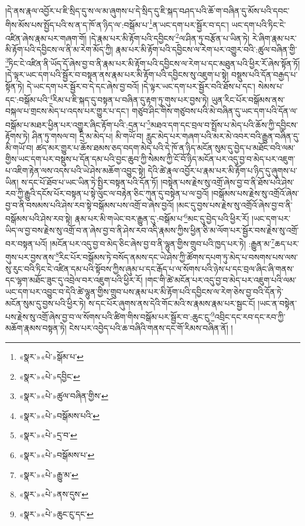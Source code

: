 །དེ་ནས་རྣལ་འབྱོར་པ་ཇི་སྲིད་དུ་ས་ལ་མ་ཞུགས་པ་དེ་སྲིད་དུ་ཇི་སྐད་བཤད་པའི་ཆོ་ག་བཞིན་དུ་མོས་པའི་དབང་གིས་མོས་པས་སྤྱོད་པའི་ས་ན་ད་ཁོ་ན་ཉིད་ལ་:བསྒོམ་པ་\footnote{«སྣར་»«པེ་»སྒོམ་པ་}ན་ཡང་དག་པར་སྦྱོར་བ་དང་། ཡང་དག་པའི་ཏིང་ངེ་འཛིན་ཞེས་རྣམ་པར་གཞག་གོ། །དེ་རྣམ་པར་མི་རྟོག་པའི་དབྱིངས་\footnote{«སྣར་»«པེ་»དབྱིང་}ལ་ཤིན་ཏུ་བརྩོན་པ་ཡིན་ཏེ། རེ་ཞིག་རྣམ་པར་མི་རྟོག་པའི་དབྱིངས་ལ་ནི་མ་རེག་མོད་ཀྱི། རྣམ་པར་མི་རྟོག་པའི་དབྱིངས་ལ་རེག་པར་འགྱུར་བའི་:ཚུལ་བཞིན་གྱི་\footnote{«སྣར་»«པེ་»ཚུལ་བཞིན་གྱིས་}ཏིང་ངེ་འཛིན་ནི་ཡོད་དོ་ཞེས་བྱ་བ་ནི་རྣམ་པར་མི་རྟོག་པའི་དབྱིངས་ལ་རེག་པ་དང་མཐུན་པའི་ཕྱིར་རོ་ཞེས་སྟོན་ཏོ། །དེ་ལྟར་ཡང་དག་པའི་སྦྱོར་བ་བསྟན་ནས་རྣམ་པར་མི་རྟོག་པའི་དབྱིངས་སུ་འཇུག་པ་སྟེ། བསྡུས་པའི་དོན་བརྒྱད་པ་སྟོན་ཏེ། དེ་ཡང་དག་པར་སྦྱོར་བ་དེ་དང་ཞེས་བྱ་བའོ། །དེ་ལྟར་ཡང་དག་པར་སྦྱོར་བའི་ཐོས་པ་དང་། སེམས་པ་དང་:བསྒོམ་པའི་\footnote{«སྣར་»«པེ་»བསྒོམས་པའི་}རིམ་པ་ཇི་སྐད་དུ་བསྟན་པ་བཞིན་དུ་རྟག་ཏུ་གུས་པར་བྱས་ཏེ། ཡུན་རིང་པོར་བསྒོམས་ནས་བསྐལ་པ་གྲངས་མེད་པ་འདས་པར་གྱུར་པ་དང་། གཙུབ་ཤིང་གིས་གཙུབས་པའི་མེ་བཞིན་དུ་ཡང་དག་པའི་དོན་ལ་བསྒོམ་པ་མཐར་ཕྱིན་པར་འགྱུར་ཞིང་རྟོག་པའི་:དྲན་པ་\footnote{«སྣར་»«པེ་»དྲ་བ་}མཐའ་དག་དང་བྲལ་བ་སྤྲོས་པ་མེད་པའི་ཆོས་ཀྱི་དབྱིངས་རྟོགས་ཏེ། ཤིན་ཏུ་གསལ་བ། དྲི་མ་མེད་པ། མི་གཡོ་བ། རླུང་མེད་པར་གཞག་པའི་མར་མེ་འབར་བའི་རྒྱུན་བཞིན་དུ་མི་གཡོ་བ། ཚད་མར་གྱུར་པ་ཆོས་ཐམས་ཅད་བདག་མེད་པའི་དེ་ཁོ་ན་ཉིད་མངོན་སུམ་དུ་བྱེད་པ་མཐོང་བའི་ལམ་གྱིས་ཡང་དག་པར་བསྡུས་པ་དོན་དམ་པའི་བྱང་ཆུབ་ཀྱི་སེམས་ཀྱི་ངོ་བོ་ཉིད་མངོན་པར་འདུ་བྱ་བ་མེད་པར་འཇུག་པ་འཇིག་རྟེན་ལས་འདས་པའི་ཡེ་ཤེས་མཆོག་འབྱུང་སྟེ། དེའི་ཚེ་རྣལ་འབྱོར་པ་རྣམ་པར་མི་རྟོག་པ་ཉིད་དུ་ཞུགས་པ་ཡིན། ས་དང་པོ་ཐོབ་པ་ཡང་ཡིན་ཏེ་སྤྱིར་བསྟན་པའི་དོན་ཏོ། །བསྟེན་པས་རྗེས་སུ་འགྲོ་ཞེས་བྱ་བ་ནི་ཐོས་པའི་ཤེས་རབ་ཀྱི་རྒྱུའི་དངོས་པོར་བསྟན་པ་སྟེ་ལུང་ལ་བརྟེན་ཅིང་ཀུན་དུ་བསྟེན་པ་ལ་བྱའོ། །བསྒོམས་པས་རྗེས་སུ་འགྲོའོ་ཞེས་བྱ་བ་ནི་བསམས་པའི་ཤེས་རབ་སྟེ་བསྒོམས་པས་འགྲོ་བ་ཞེས་བྱའོ། །མང་དུ་བྱས་པས་རྗེས་སུ་འགྲོའོ་ཞེས་བྱ་བ་ནི་བསྒོམས་པའི་ཤེས་རབ་སྟེ། རྣམ་པར་མི་གཡེང་བར་རྒྱུན་དུ་:བསྒོམ་པ་\footnote{«སྣར་»«པེ་»བསྒོམས་པ་}མང་དུ་བྱེད་པའི་ཕྱིར་རོ། །ཡང་དག་པར་ཡིད་ལ་བྱ་བས་རྗེས་སུ་འགྲོ་བ་ན་ཞེས་བྱ་བ་ནི་ཤེས་རབ་འདི་རྣམས་ཀྱིས་ཕྱིན་ཅི་མ་ལོག་པར་སྦྱོར་བས་རྗེས་སུ་འགྲོ་བར་བསྟན་པའོ། །མངོན་པར་འདུ་བྱ་བ་མེད་ཅིང་ཞེས་བྱ་བ་ནི་ལྷུན་གྱིས་གྲུབ་པའི་ཁྱད་པར་ཏེ། :རྒྱུན་མ་\footnote{«སྣར་»«པེ་»རྒྱུ་མ་}ཆད་པར་གུས་པར་བྱས་ནས་\footnote{«སྣར་»«པེ་»ནས་དུས་}རིང་པོར་བསྒོམས་ཏེ་བསོད་ནམས་དང་ཡེ་ཤེས་ཀྱི་ཚོགས་དཔག་ཏུ་མེད་པ་བསགས་པས་ལས་སུ་རུང་བའི་ཏིང་ངེ་འཛིན་དམ་པའི་སྟོབས་ཀྱིས་ཞུམ་པ་དང་རྒོད་པ་ལ་སོགས་པའི་ཉེས་པ་དང་བྲལ་ཞིང་ཞི་གནས་དང་ལྷག་མཐོང་ཟུང་དུ་འབྲེལ་བར་འཇུག་པའི་ཕྱིར་རོ། །གང་གི་ཚེ་མངོན་པར་འདུ་བྱ་བ་མེད་པར་འཇུག་པའི་ལམ་ཡང་དག་པར་འབྱུང་བ་དེའི་ཚེ་ལྷུན་གྱིས་གྲུབ་པས་རྣམ་པར་མི་རྟོག་པའི་དབྱིངས་ལ་རེག་ཅེས་བྱ་བའི་དོན་ཏེ་མངོན་སུམ་དུ་བྱས་པའི་ཕྱིར་ཏེ། ས་དང་པོར་ཞུགས་ནས་དེའི་གོང་མའི་ས་རྣམས་རྣམ་པར་སྦྱང་ངོ། །ཡང་ན་བསྟེན་པས་རྗེས་སུ་འགྲོ་ཞེས་བྱ་བ་ལ་སོགས་པའི་ཚིག་གིས་བསྒོམ་པར་སྦྱོར་བ་:ཆུང་ངུ་\footnote{«སྣར་»«པེ་»ཆུང་ངུ་དང་}འབྲིང་དང་རབ་དང་རབ་ཀྱི་མཆོག་རྣམས་བསྟན་ཏེ། ངེས་པར་འབྱེད་པའི་ཆ་བཞིའི་གནས་དང་གོ་རིམས་བཞིན་ནོ། །
